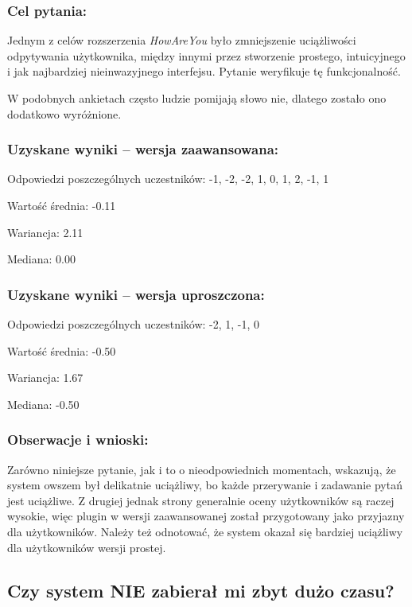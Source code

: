 	\subsubsection{Cel pytania:}
	
	Jednym z celów rozszerzenia \textit{HowAreYou} było zmniejszenie uciążliwości odpytywania użytkownika, między innymi przez stworzenie prostego, intuicyjnego i jak najbardziej nieinwazyjnego interfejsu. Pytanie weryfikuje tę funkcjonalność.
	
	W podobnych ankietach często ludzie pomijają słowo nie, dlatego zostało ono dodatkowo wyróżnione.
	
	\subsubsection{Uzyskane wyniki -- wersja zaawansowana:}
	
	Odpowiedzi poszczególnych uczestników: -1, -2, -2, 1, 0, 1, 2, -1, 1
	
	Wartość średnia: -0.11
	
	Wariancja: 2.11
	
	Mediana: 0.00
	
	\subsubsection{Uzyskane wyniki -- wersja uproszczona:}
	
	Odpowiedzi poszczególnych uczestników: -2, 1, -1, 0
	
	Wartość średnia: -0.50
	
	Wariancja: 1.67
	
	Mediana: -0.50
	
	\subsubsection{Obserwacje i wnioski:}
	
	Zarówno niniejsze pytanie, jak i to o nieodpowiednich momentach, wskazują, że system owszem był delikatnie uciążliwy, bo każde przerywanie i zadawanie pytań jest uciążliwe. Z drugiej jednak strony generalnie oceny użytkowników są raczej wysokie, więc plugin w wersji zaawansowanej został przygotowany jako przyjazny dla użytkowników. Należy też odnotować, że system okazał się bardziej uciążliwy dla użytkowników wersji prostej.
	
	
	
\subsection{Czy system NIE zabierał mi zbyt dużo czasu?}
	
